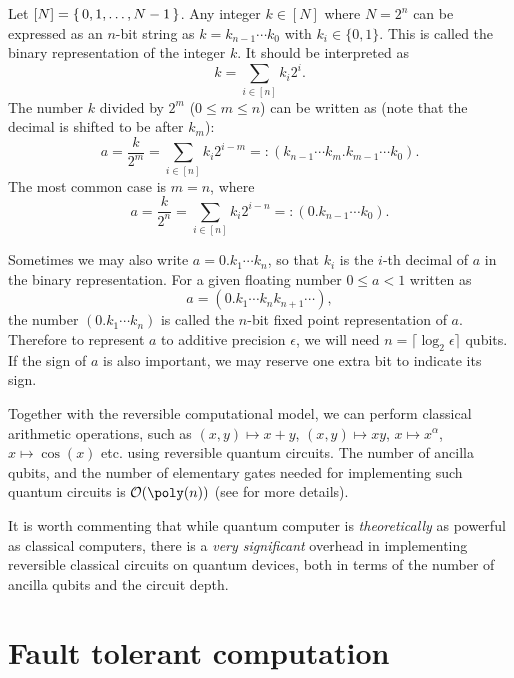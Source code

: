 Let \([N]=\set{0,1,\ldots,N-1}\). Any integer \(k\in[N]\) where \(N=2^n\)
can be expressed as an \(n\)-bit string as \(k=k_{n-1}\cdots k_0\) with
\(k_i\in\{0,1\}\). 
This is called the binary representation of the integer $k$. 
It should be interpreted as
\begin{equation}k=\sum_{i\in[n]} k_i 2^{i}.\end{equation}
The number $k$ divided by $2^m$ ($0\le m\le n$) can be written as (note that the decimal is shifted to be after $k_m$):
\begin{equation}
a=\frac{k}{2^m}=\sum_{i\in[n]} k_i 2^{i-m}=:(k_{n-1}\cdots k_{m}.k_{m-1}\cdots k_0).
\end{equation}
The most common case is $m=n$, where
\begin{equation}
a=\frac{k}{2^n}=\sum_{i\in[n]} k_i 2^{i-n}=:(0.k_{n-1}\cdots k_0).
\end{equation}

Sometimes we may also write $a=0.k_{1}\cdots k_{n}$, so that $k_i$ is the $i$-th decimal of $a$ in the binary representation. For a given floating number $0\le a<1$ written as
\begin{equation}
a=(0.k_1\cdots k_n k_{n+1}\cdots),
\end{equation}
the number $(0.k_1\cdots k_n)$ is called the $n$-bit fixed point representation of $a$. Therefore to represent $a$ to additive precision $\epsilon$, we will need $n=\lceil\log_2 \epsilon\rceil$ qubits. If the sign of $a$ is also important, we may reserve one extra bit to indicate its sign.

Together with the reversible computational model, we can perform classical arithmetic operations, such as $(x,y)\mapsto x+y$, $(x,y)\mapsto xy$, $x\mapsto x^{\alpha}$, $x\mapsto \cos(x)$ etc. using reversible quantum circuits. The number of ancilla qubits, and the number of elementary gates needed for implementing such quantum circuits is $\Or(\poly(n))$ (see \cite[Chapter 6]{RieffelPolak2011} for more details). 

It is worth commenting that while quantum computer is \emph{theoretically} as powerful as classical computers, there is a \emph{very significant} overhead in implementing reversible classical circuits on quantum devices, both in terms of the number of ancilla qubits and the circuit depth. 

\section{Fault tolerant computation}\label{sec:fault_tolerant}


